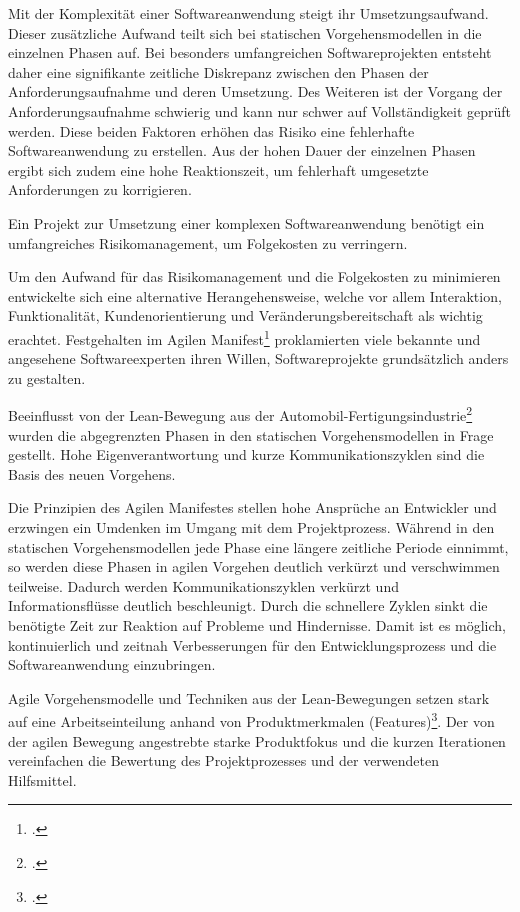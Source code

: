 Mit der Komplexität einer Softwareanwendung steigt ihr Umsetzungsaufwand. Dieser zusätzliche Aufwand teilt sich bei statischen Vorgehensmodellen in die einzelnen Phasen auf. Bei besonders umfangreichen Softwareprojekten entsteht daher eine signifikante zeitliche Diskrepanz zwischen den Phasen der Anforderungsaufnahme und deren Umsetzung. Des Weiteren ist der Vorgang der Anforderungsaufnahme schwierig und kann nur schwer auf Vollständigkeit geprüft werden. Diese beiden Faktoren erhöhen das Risiko eine fehlerhafte Softwareanwendung zu erstellen. Aus der hohen Dauer der einzelnen Phasen ergibt sich zudem eine hohe Reaktionszeit, um fehlerhaft umgesetzte Anforderungen zu korrigieren.

Ein Projekt zur Umsetzung einer komplexen Softwareanwendung benötigt ein umfangreiches Risikomanagement, um Folgekosten 
zu verringern.

Um den Aufwand für das Risikomanagement und die Folgekosten zu minimieren entwickelte sich eine alternative
Herangehensweise, welche vor allem Interaktion, Funktionalität, Kundenorientierung und Veränderungsbereitschaft als
wichtig erachtet. Festgehalten im Agilen Manifest\footcite[vgl.][]{agile-manifest} proklamierten viele bekannte und angesehene
Softwareexperten ihren Willen, Softwareprojekte grundsätzlich anders zu gestalten.

Beeinflusst von der Lean-Bewegung aus der Automobil-Fertigungsindustrie\footcite[vgl.][]{kent1999} wurden die abgegrenzten Phasen 
in den statischen Vorgehensmodellen in Frage gestellt. Hohe Eigenverantwortung und kurze Kommunikationszyklen sind die 
Basis des neuen Vorgehens.

Die Prinzipien des \glqq Agilen Manifestes\grqq{} stellen hohe Ansprüche an Entwickler und erzwingen ein Umdenken im Umgang mit dem Projektprozess. Während in den statischen Vorgehensmodellen jede Phase eine längere zeitliche Periode einnimmt, so werden diese Phasen in agilen Vorgehen deutlich verkürzt und verschwimmen teilweise. Dadurch werden Kommunikationszyklen verkürzt und Informationsflüsse deutlich beschleunigt.
Durch die schnellere Zyklen sinkt die benötigte Zeit zur Reaktion auf Probleme und Hindernisse. Damit ist es möglich, kontinuierlich und zeitnah Verbesserungen für den Entwicklungsprozess und die Softwareanwendung einzubringen. 

Agile Vorgehensmodelle und Techniken aus der Lean-Bewegungen setzen stark auf eine Arbeitseinteilung anhand von Produktmerkmalen (Features)\footcite[vgl.][Kap. 6. Product Backlog]{rubin-scrum}. Der von der agilen Bewegung angestrebte starke Produktfokus und die kurzen Iterationen vereinfachen die Bewertung des Projektprozesses und der verwendeten Hilfsmittel.

